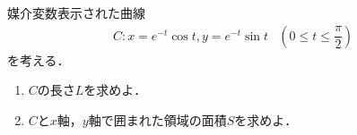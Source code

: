 \documentclass[../../main.tex]{subfiles}
\begin{document}
媒介変数表示された曲線
\begin{align*}
  C: x=e^{-t}\cos t, y=e^{-t}\sin t & \left(0\le t\le \dfrac{\pi}{2}\right)
\end{align*}
を考える．
\begin{enumerate}
  \item $C$の長さ$L$を求めよ．
  \item $C$と$x$軸，$y$軸で囲まれた領域の面積$S$を求めよ．
\end{enumerate}
\end{document}
